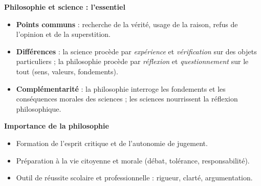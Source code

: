 \documentclass[11pt]{article}
\newcommand{\cle}[1]{{\popxbold\color{popdark}#1}}
\begin{document}
\begin{bilan}
\textbf{Philosophie et science : l'essentiel}
\begin{itemize}
\item \textbf{Points communs} : recherche de la vérité, usage de la raison, refus de l'opinion et de la superstition.
\item \textbf{Différences} : la science procède par \emph{expérience} et \emph{vérification} sur des objets particuliers ; la philosophie procède par \emph{réflexion} et \emph{questionnement} sur le tout (sens, valeurs, fondements).
\item \textbf{Complémentarité} : la philosophie interroge les fondements et les conséquences morales des sciences ; les sciences nourrissent la réflexion philosophique.
\end{itemize}

\textbf{Importance de la philosophie}
\begin{itemize}
\item Formation de l'\cle{esprit critique} et de l'autonomie de jugement.
\item Préparation à la vie \cle{citoyenne} et morale (débat, tolérance, responsabilité).
\item Outil de réussite scolaire et professionnelle : rigueur, clarté, argumentation.
\end{itemize}
\end{bilan}
\end{document}
